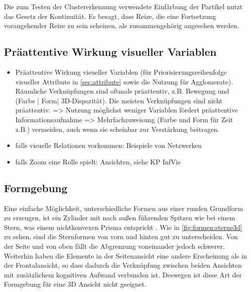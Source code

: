 Die zum Testen der Clustererkennung verwendete Einfärbung der Partikel nutzt das Gesetz der Kontinuität. Es besagt, dass Reize, die eine Fortsetzung vorangehender Reize zu sein scheinen, als zusammengehörig angesehen werden.

\subsection{Präattentive Wirkung visueller Variablen}

\begin{itemize}
	\item Präattentive Wirkung visueller Variablen (für Priorisierungsreihenfolge visueller Attribute in \autoref{sec:attribute} sowie die Nutzung für Agglomerate). Räumliche Verknüpfungen sind oftmals präattentiv, z.B. Bewegung und (Farbe | Form| 3D-Disparität). Die meisten Verknüpfungen sind nicht präattentiv. => Nutzung möglichst weniger Variablen fördert präattentive Informationsaufnahme =>  Mehrfachzuweisung (Farbe und Form für Zeit z.B.) vermeiden, auch wenn sie scheinbar zur Verstärkung beitragen.
	\item falls visuelle Relationen vorkommen: Beispiele von Netzwerken
	\item falls Zoom eine Rolle spielt: Ansichten, siehe KP InfVis
\end{itemize}

\subsection{Formgebung}\label{sec:grundlagen:formgebung}
Eine einfache Möglichkeit, unterschiedliche Formen aus einer runden Grundform zu erzeugen, ist ein Zylinder mit nach außen führenden Spitzen wie bei einem Stern, was einem nichtkonvexen Prisma entspricht \cite{UniformPolyhedra}. Wie in \autoref{fig:formen:sterne3d} zu sehen, sind die Sternformen von vorn und hinten gut zu unterscheiden. Von der Seite und von oben fällt die Abgrenzung voneinander jedoch schwerer. Weiterhin haben die Elemente in der Seitenansicht eine andere Erscheinung als in der Frontalansicht, so dass dadurch die Verknüpfung zwischen beiden Ansichten mit zusätzlichem kognitiven Aufwand verbunden ist. Deswegen ist diese Art der Formgebung für eine 3D Ansicht nicht geeignet.

